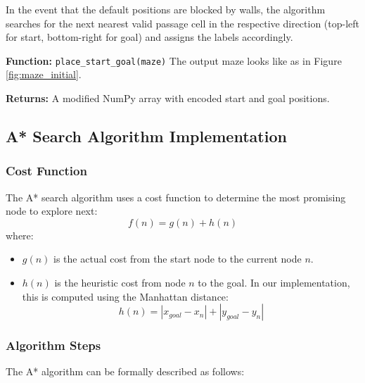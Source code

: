 \documentclass[a4paper, journal]{IEEEtran}
\begin{document}
In the event that the default positions are blocked by walls, the algorithm searches for the next nearest valid passage cell in the respective direction (top-left for start, bottom-right for goal) and assigns the labels accordingly.

\vspace{0.5em}
\textbf{Function:} \texttt{place\_start\_goal(maze)}
The output maze looks like as in Figure \ref{fig:maze_initial}.

\vspace{0.5em}
\textbf{Returns:} A modified NumPy array with encoded start and goal positions.
\subsection{A* Search Algorithm Implementation}

\subsubsection{Cost Function}
The A* search algorithm uses a cost function to determine the most promising node to explore next:
\[
    f(n) = g(n) + h(n)
\]
where:
\begin{itemize}
    \item $g(n)$ is the actual cost from the start node to the current node $n$.
    \item $h(n)$ is the heuristic cost from node $n$ to the goal. In our implementation, this is computed using the Manhattan distance:
          \[
              h(n) = |x_{goal} - x_n| + |y_{goal} - y_n|
          \]
\end{itemize}

\subsubsection{Algorithm Steps}
The A* algorithm can be formally described as follows:
\end{document}
